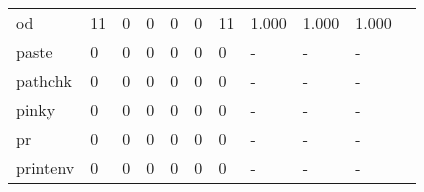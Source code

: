 \begin{longtable}{lp{1.2cm}p{1.2cm}p{1.2cm}p{1.2cm}p{1.2cm}p{1.2cm}p{1.2cm}p{1.2cm}p{1.2cm}p{1.2cm}}
od        &                                    11 &                                                  0 &                                                  0 &                                                  0 &                                                  0 &                                                 11 &                                              1.000 &                                              1.000 &                                              1.000 \\
paste     &                                     0 &                                                  0 &                                                  0 &                                                  0 &                                                  0 &                                                  0 &                                                  - &                                                  - &                                                  - \\
pathchk   &                                     0 &                                                  0 &                                                  0 &                                                  0 &                                                  0 &                                                  0 &                                                  - &                                                  - &                                                  - \\
pinky     &                                     0 &                                                  0 &                                                  0 &                                                  0 &                                                  0 &                                                  0 &                                                  - &                                                  - &                                                  - \\
pr        &                                     0 &                                                  0 &                                                  0 &                                                  0 &                                                  0 &                                                  0 &                                                  - &                                                  - &                                                  - \\
printenv  &                                     0 &                                                  0 &                                                  0 &                                                  0 &                                                  0 &                                                  0 &                                                  - &                                                  - &                                                  - \\

\end{longtable}
